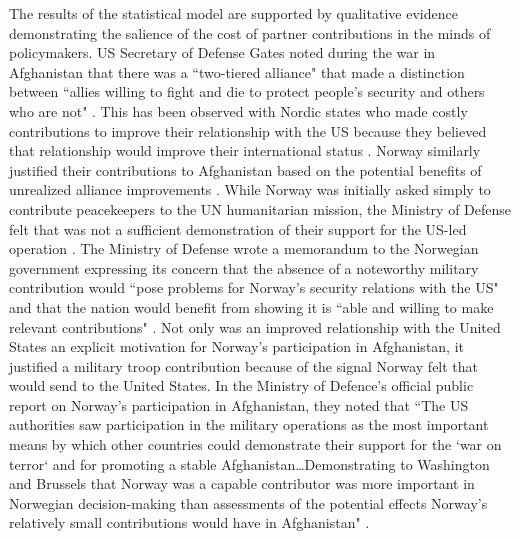 \documentclass[12pt,letterpaper]{article}
\begin{document}
		The results of the statistical model are supported by qualitative evidence demonstrating the salience of the cost of partner contributions in the minds of policymakers. US Secretary of Defense Gates noted during the war in Afghanistan that there was a ``two-tiered alliance" that made a distinction between ``allies willing to fight and die to protect people's security and others who are not" \citep[328]{ringsmose_natoburdensharingredux_2010}. This has been observed with Nordic states who made costly contributions to improve their relationship with the US because they believed that relationship would improve their international status \citep{pedersen_bandwagonstatuschanging_2018}. Norway similarly justified their contributions to Afghanistan based on the potential benefits of unrealized alliance improvements \citep{oma_smallstatesburdensharing_2014}. While Norway was initially asked simply to contribute peacekeepers to the UN humanitarian mission, the Ministry of Defense felt that was not a sufficient demonstration of their support for the US-led operation \citep{ministryofdefenceiisecuritypolicy_mulignorskubatstotte_2001}. The Ministry of Defense wrote a memorandum to the Norwegian government expressing its concern that the absence of a noteworthy military contribution would ``pose problems for Norway's security relations with the US" and that the nation would benefit from showing it is ``able and willing to make relevant contributions" \citep{ministryofdefenceiisecuritypolicy_muligenorskemilitaere_2001}. Not only was an improved relationship with the United States an explicit motivation for Norway's participation in Afghanistan, it justified a military troop contribution because of the signal Norway felt that would send to the United States. In the Ministry of Defence's official public report on Norway's participation in Afghanistan, they noted that ``The US authorities saw participation in the military operations as the most important means by which other countries could demonstrate their support for the `war on terror` and for promoting a stable Afghanistan\ldots Demonstrating to Washington and Brussels that Norway was a capable contributor was more important in Norwegian decision-making than assessments of the potential effects Norway's relatively small contributions would have in Afghanistan" \citep[214-216]{godal_goodallynorway_2016}.
\end{document}
